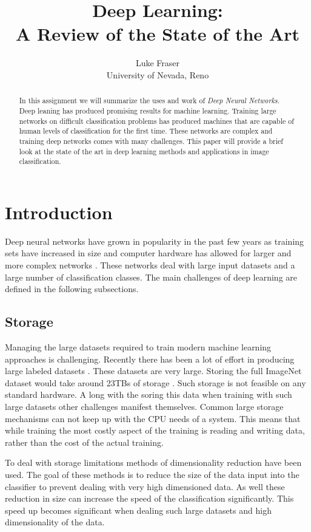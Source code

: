 \documentclass[font=12pt]{article}
\title{Deep Learning:\\ A Review of the State of the Art}
\author{Luke Fraser\\
University of Nevada, Reno}
\begin{document}
\maketitle
\begin{abstract}
In this assignment we will summarize the uses and work of \emph{Deep Neural Networks}. Deep leaning has produced promising results for machine learning. Training large networks on difficult classification problems has produced machines that are capable of human levels of classification for the first time. These networks are complex and training deep networks comes with many challenges. This paper will provide a brief look at the state of the art in deep learning methods and applications in image classification.
\end{abstract}

\section{Introduction}
Deep neural networks have grown in popularity in the past few years as training sets have increased in size and computer hardware has allowed for larger and more complex networks \cite{krizhevsky2012imagenet,sanchez2011high,6248110}. These networks deal with large input datasets and a large number of classification classes. The main challenges of deep learning are defined in the following subsections.
\subsection{Storage}
Managing the large datasets required to train modern machine learning approaches is challenging. Recently there has been a lot of effort in producing large labeled datasets \cite{deng2009imagenet,Torralba:2008:MTI:1444381.1444403}. These datasets are very large. Storing the full ImageNet\cite{deng2009imagenet} dataset would take around 23TBs of storage \cite{sanchez2011high}. Such storage is not feasible on any standard hardware. A long with the soring this data when training with such large datasets other challenges manifest themselves. Common large storage mechanisms can not keep up with the CPU needs of a system. This means that while training the most costly aspect of the training is reading and writing data, rather than the cost of the actual training.

To deal with storage limitations methods of dimensionality reduction have been used. The goal of these methods is to reduce the size of the data input into the classifier to prevent dealing with very high dimensioned data. As well these reduction in size can increase the speed of the classification significantly. This speed up becomes significant when dealing such large datasets and high dimensionality of the data.
\end{document}
